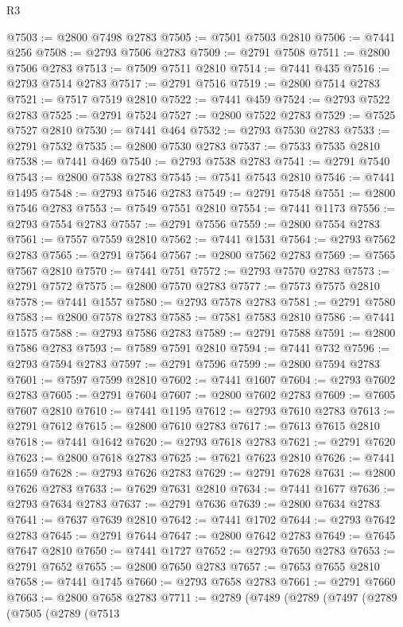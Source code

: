 \begin{lexlean}{R3}
\begin{coremodule}
@7503 := @2800 @7498 @2783
@7505 := @7501 @7503 @2810
@7506 := @7441 @256
@7508 := @2793 @7506 @2783
@7509 := @2791 @7508
@7511 := @2800 @7506 @2783
@7513 := @7509 @7511 @2810
@7514 := @7441 @435
@7516 := @2793 @7514 @2783
@7517 := @2791 @7516
@7519 := @2800 @7514 @2783
@7521 := @7517 @7519 @2810
@7522 := @7441 @459
@7524 := @2793 @7522 @2783
@7525 := @2791 @7524
@7527 := @2800 @7522 @2783
@7529 := @7525 @7527 @2810
@7530 := @7441 @464
@7532 := @2793 @7530 @2783
@7533 := @2791 @7532
@7535 := @2800 @7530 @2783
@7537 := @7533 @7535 @2810
@7538 := @7441 @469
@7540 := @2793 @7538 @2783
@7541 := @2791 @7540
@7543 := @2800 @7538 @2783
@7545 := @7541 @7543 @2810
@7546 := @7441 @1495
@7548 := @2793 @7546 @2783
@7549 := @2791 @7548
@7551 := @2800 @7546 @2783
@7553 := @7549 @7551 @2810
@7554 := @7441 @1173
@7556 := @2793 @7554 @2783
@7557 := @2791 @7556
@7559 := @2800 @7554 @2783
@7561 := @7557 @7559 @2810
@7562 := @7441 @1531
@7564 := @2793 @7562 @2783
@7565 := @2791 @7564
@7567 := @2800 @7562 @2783
@7569 := @7565 @7567 @2810
@7570 := @7441 @751
@7572 := @2793 @7570 @2783
@7573 := @2791 @7572
@7575 := @2800 @7570 @2783
@7577 := @7573 @7575 @2810
@7578 := @7441 @1557
@7580 := @2793 @7578 @2783
@7581 := @2791 @7580
@7583 := @2800 @7578 @2783
@7585 := @7581 @7583 @2810
@7586 := @7441 @1575
@7588 := @2793 @7586 @2783
@7589 := @2791 @7588
@7591 := @2800 @7586 @2783
@7593 := @7589 @7591 @2810
@7594 := @7441 @732
@7596 := @2793 @7594 @2783
@7597 := @2791 @7596
@7599 := @2800 @7594 @2783
@7601 := @7597 @7599 @2810
@7602 := @7441 @1607
@7604 := @2793 @7602 @2783
@7605 := @2791 @7604
@7607 := @2800 @7602 @2783
@7609 := @7605 @7607 @2810
@7610 := @7441 @1195
@7612 := @2793 @7610 @2783
@7613 := @2791 @7612
@7615 := @2800 @7610 @2783
@7617 := @7613 @7615 @2810
@7618 := @7441 @1642
@7620 := @2793 @7618 @2783
@7621 := @2791 @7620
@7623 := @2800 @7618 @2783
@7625 := @7621 @7623 @2810
@7626 := @7441 @1659
@7628 := @2793 @7626 @2783
@7629 := @2791 @7628
@7631 := @2800 @7626 @2783
@7633 := @7629 @7631 @2810
@7634 := @7441 @1677
@7636 := @2793 @7634 @2783
@7637 := @2791 @7636
@7639 := @2800 @7634 @2783
@7641 := @7637 @7639 @2810
@7642 := @7441 @1702
@7644 := @2793 @7642 @2783
@7645 := @2791 @7644
@7647 := @2800 @7642 @2783
@7649 := @7645 @7647 @2810
@7650 := @7441 @1727
@7652 := @2793 @7650 @2783
@7653 := @2791 @7652
@7655 := @2800 @7650 @2783
@7657 := @7653 @7655 @2810
@7658 := @7441 @1745
@7660 := @2793 @7658 @2783
@7661 := @2791 @7660
@7663 := @2800 @7658 @2783
@7711 := @2789
    (@7489
      (@2789
        (@7497
          (@2789
            (@7505
              (@2789
                (@7513

\end{coremodule}
\end{lexlean}
